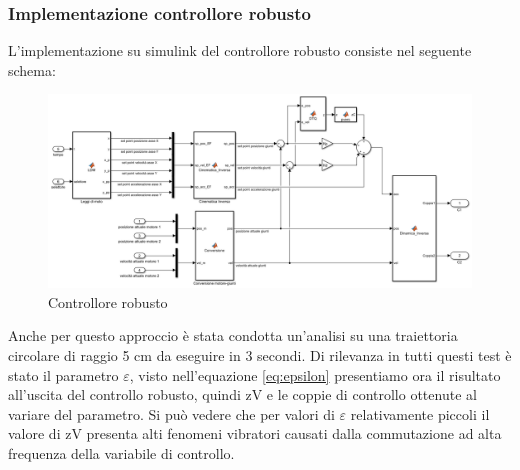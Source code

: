 \subsubsection*{Implementazione controllore robusto}
L'implementazione su simulink del controllore robusto consiste nel seguente schema: 
\begin{figure}[ht]
	\begin{center}
		\includegraphics[scale=0.5]{Immagini/Controllori/RobustSchema}
		\caption{Controllore robusto}
		\label{fig:robustSchema}
	\end{center}
\end{figure}
Anche per questo approccio è stata condotta un'analisi su una traiettoria circolare di raggio 5 cm da eseguire in 3 secondi. Di rilevanza in tutti questi test è stato il parametro $\varepsilon$, visto nell'equazione \ref{eq:epsilon} presentiamo ora il risultato all'uscita del controllo robusto, quindi zV e le coppie di controllo ottenute al variare del parametro.
Si può vedere che per valori di $\varepsilon$ relativamente piccoli il valore di zV presenta alti fenomeni vibratori causati dalla commutazione ad alta frequenza della variabile di controllo.

